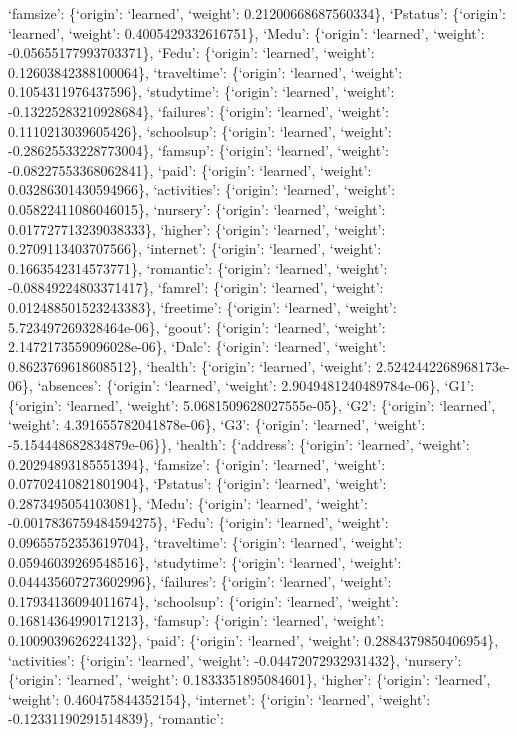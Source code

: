 \documentclass[
]{article}
\begin{document}
`famsize': \{`origin': `learned', `weight': 0.21200668687560334\},
`Pstatus': \{`origin': `learned', `weight': 0.4005429332616751\},
`Medu': \{`origin': `learned', `weight': -0.05655177993703371\}, `Fedu':
\{`origin': `learned', `weight': 0.12603842388100064\}, `traveltime':
\{`origin': `learned', `weight': 0.1054311976437596\}, `studytime':
\{`origin': `learned', `weight': -0.13225283210928684\}, `failures':
\{`origin': `learned', `weight': 0.1110213039605426\}, `schoolsup':
\{`origin': `learned', `weight': -0.28625533228773004\}, `famsup':
\{`origin': `learned', `weight': -0.08227553368062841\}, `paid':
\{`origin': `learned', `weight': 0.03286301430594966\}, `activities':
\{`origin': `learned', `weight': 0.05822411086046015\}, `nursery':
\{`origin': `learned', `weight': 0.017727713239038333\}, `higher':
\{`origin': `learned', `weight': 0.2709113403707566\}, `internet':
\{`origin': `learned', `weight': 0.1663542314573771\}, `romantic':
\{`origin': `learned', `weight': -0.08849224803371417\}, `famrel':
\{`origin': `learned', `weight': 0.012488501523243383\}, `freetime':
\{`origin': `learned', `weight': 5.723497269328464e-06\}, `goout':
\{`origin': `learned', `weight': 2.1472173559096028e-06\}, `Dalc':
\{`origin': `learned', `weight': 0.8623769618608512\}, `health':
\{`origin': `learned', `weight': 2.5242442268968173e-06\}, `absences':
\{`origin': `learned', `weight': 2.9049481240489784e-06\}, `G1':
\{`origin': `learned', `weight': 5.0681509628027555e-05\}, `G2':
\{`origin': `learned', `weight': 4.391655782041878e-06\}, `G3':
\{`origin': `learned', `weight': -5.154448682834879e-06\}\}, `health':
\{`address': \{`origin': `learned', `weight': 0.20294893185551394\},
`famsize': \{`origin': `learned', `weight': 0.07702410821801904\},
`Pstatus': \{`origin': `learned', `weight': 0.2873495054103081\},
`Medu': \{`origin': `learned', `weight': -0.0017836759484594275\},
`Fedu': \{`origin': `learned', `weight': 0.09655752353619704\},
`traveltime': \{`origin': `learned', `weight': 0.05946039269548516\},
`studytime': \{`origin': `learned', `weight': 0.044435607273602996\},
`failures': \{`origin': `learned', `weight': 0.17934136094011674\},
`schoolsup': \{`origin': `learned', `weight': 0.16814364990171213\},
`famsup': \{`origin': `learned', `weight': 0.1009039626224132\}, `paid':
\{`origin': `learned', `weight': 0.2884379850406954\}, `activities':
\{`origin': `learned', `weight': -0.04472072932931432\}, `nursery':
\{`origin': `learned', `weight': 0.1833351895084601\}, `higher':
\{`origin': `learned', `weight': 0.460475844352154\}, `internet':
\{`origin': `learned', `weight': -0.12331190291514839\}, `romantic':
\end{document}
